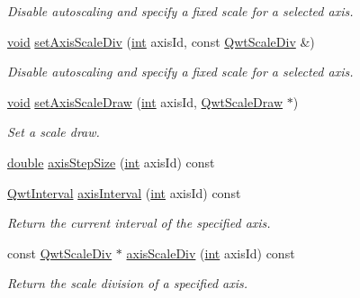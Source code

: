 \begin{DoxyCompactItemize}
\begin{DoxyCompactList}\small\item\em Disable autoscaling and specify a fixed scale for a selected axis. \end{DoxyCompactList}\item 
\hyperlink{group___u_a_v_objects_plugin_ga444cf2ff3f0ecbe028adce838d373f5c}{void} \hyperlink{class_qwt_plot_a2365da57b983eb39752fa4f6378c225a}{set\-Axis\-Scale\-Div} (\hyperlink{ioapi_8h_a787fa3cf048117ba7123753c1e74fcd6}{int} axis\-Id, const \hyperlink{class_qwt_scale_div}{Qwt\-Scale\-Div} \&)
\begin{DoxyCompactList}\small\item\em Disable autoscaling and specify a fixed scale for a selected axis. \end{DoxyCompactList}\item 
\hyperlink{group___u_a_v_objects_plugin_ga444cf2ff3f0ecbe028adce838d373f5c}{void} \hyperlink{class_qwt_plot_a956a14b08e016eb83768ff4187d3849d}{set\-Axis\-Scale\-Draw} (\hyperlink{ioapi_8h_a787fa3cf048117ba7123753c1e74fcd6}{int} axis\-Id, \hyperlink{class_qwt_scale_draw}{Qwt\-Scale\-Draw} $\ast$)
\begin{DoxyCompactList}\small\item\em Set a scale draw. \end{DoxyCompactList}\item 
\hyperlink{_super_l_u_support_8h_a8956b2b9f49bf918deed98379d159ca7}{double} \hyperlink{class_qwt_plot_a6f5fa5348dec97f2531f7ec58e727bee}{axis\-Step\-Size} (\hyperlink{ioapi_8h_a787fa3cf048117ba7123753c1e74fcd6}{int} axis\-Id) const 
\item 
\hyperlink{class_qwt_interval}{Qwt\-Interval} \hyperlink{class_qwt_plot_ab4c5ab07abc1252a325d8ba2627ab5d3}{axis\-Interval} (\hyperlink{ioapi_8h_a787fa3cf048117ba7123753c1e74fcd6}{int} axis\-Id) const 
\begin{DoxyCompactList}\small\item\em Return the current interval of the specified axis. \end{DoxyCompactList}\item 
const \hyperlink{class_qwt_scale_div}{Qwt\-Scale\-Div} $\ast$ \hyperlink{class_qwt_plot_a596fc7e7960324ddc949c36242c5e6d6}{axis\-Scale\-Div} (\hyperlink{ioapi_8h_a787fa3cf048117ba7123753c1e74fcd6}{int} axis\-Id) const 
\begin{DoxyCompactList}\small\item\em Return the scale division of a specified axis. \end{DoxyCompactList}\item 

\end{DoxyCompactItemize}
